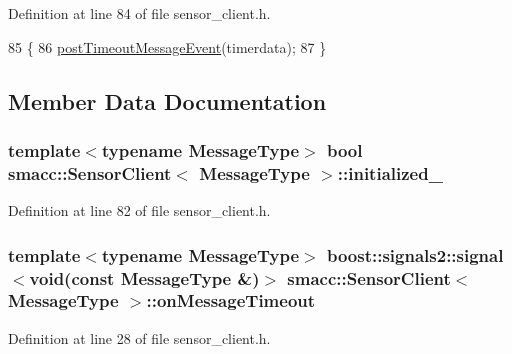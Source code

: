 Definition at line 84 of file sensor\+\_\+client.\+h.


\begin{DoxyCode}
85   \{
86     \hyperlink{classsmacc_1_1SensorClient_ad2c6d9f2e7ceddac26024cd5901a6739}{postTimeoutMessageEvent}(timerdata);
87   \}
\end{DoxyCode}


\subsection{Member Data Documentation}
\subsubsection[{\texorpdfstring{initialized\+\_\+}{initialized_}}]{\setlength{\rightskip}{0pt plus 5cm}template$<$typename Message\+Type$>$ {\bf bool} {\bf smacc\+::\+Sensor\+Client}$<$ Message\+Type $>$\+::initialized\+\_\+\hspace{0.3cm}{\ttfamily [private]}}\hypertarget{classsmacc_1_1SensorClient_a7dde11291a16f6c2edaa02552895ee9e}{}\label{classsmacc_1_1SensorClient_a7dde11291a16f6c2edaa02552895ee9e}


Definition at line 82 of file sensor\+\_\+client.\+h.

\subsubsection[{\texorpdfstring{on\+Message\+Timeout}{onMessageTimeout}}]{\setlength{\rightskip}{0pt plus 5cm}template$<$typename Message\+Type$>$ boost\+::signals2\+::signal$<$void(const Message\+Type \&)$>$ {\bf smacc\+::\+Sensor\+Client}$<$ Message\+Type $>$\+::on\+Message\+Timeout}\hypertarget{classsmacc_1_1SensorClient_a3652c00d16a1a82ef6b43466ef360c72}{}\label{classsmacc_1_1SensorClient_a3652c00d16a1a82ef6b43466ef360c72}


Definition at line 28 of file sensor\+\_\+client.\+h.

